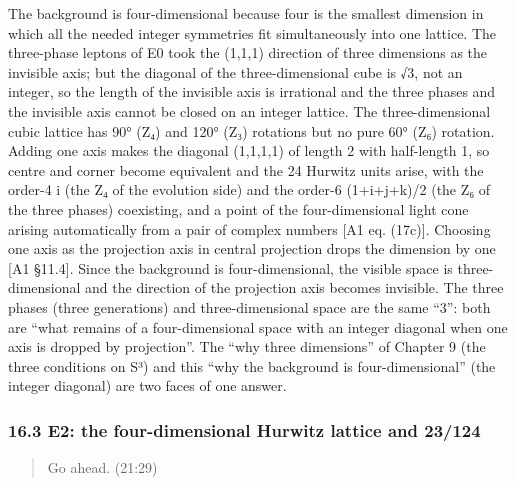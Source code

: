 \documentclass[
  a4paper,
]{article}
\begin{document}
The background is four-dimensional because four is the smallest
dimension in which all the needed integer symmetries fit simultaneously
into one lattice. The three-phase leptons of E0 took the (1,1,1)
direction of three dimensions as the invisible axis; but the diagonal of
the three-dimensional cube is √3, not an integer, so the length of the
invisible axis is irrational and the three phases and the invisible axis
cannot be closed on an integer lattice. The three-dimensional cubic
lattice has 90° (Z₄) and 120° (Z₃) rotations but no pure 60° (Z₆)
rotation. Adding one axis makes the diagonal (1,1,1,1) of length 2 with
half-length 1, so centre and corner become equivalent and the 24 Hurwitz
units arise, with the order-4 i (the Z₄ of the evolution side) and the
order-6 (1+i+j+k)/2 (the Z₆ of the three phases) coexisting, and a point
of the four-dimensional light cone arising automatically from a pair of
complex numbers {[}A1 eq. (17c){]}. Choosing one axis as the projection
axis in central projection drops the dimension by one {[}A1 §11.4{]}.
Since the background is four-dimensional, the visible space is
three-dimensional and the direction of the projection axis becomes
invisible. The three phases (three generations) and three-dimensional
space are the same ``3'': both are ``what remains of a four-dimensional
space with an integer diagonal when one axis is dropped by projection''.
The ``why three dimensions'' of Chapter 9 (the three conditions on S³)
and this ``why the background is four-dimensional'' (the integer
diagonal) are two faces of one answer.

\subsubsection{16.3 E2: the four-dimensional Hurwitz lattice and
23/124}\label{e2-the-four-dimensional-hurwitz-lattice-and-23124}

\begin{quote}
Go ahead. (21:29)
\end{quote}
\end{document}
